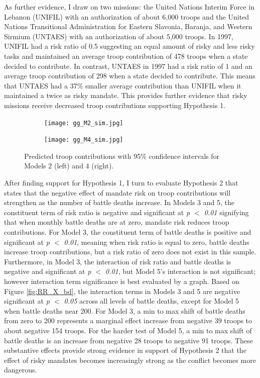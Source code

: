 \documentclass[12pt]{article}
\begin{document}
As further evidence, I draw on two missions: the United Nations Interim Force in Lebanon (UNIFIL) with an authorization of about 6,000 troops and the United Nations Transitional Administration for Eastern Slavonia, Baranja, and Western Sirmium (UNTAES) with an authorization of about 5,000 troops. In 1997, UNIFIL had a risk ratio of 0.5 suggesting an equal amount of risky and less risky tasks and maintained an average troop contribution of 478 troops when a state decided to contribute. In contrast, UNTAES in 1997 had a risk ratio of 1 and an average troop contribution of 298 when a state decided to contribute. This means that UNTAES had a 37\% smaller average contribution than UNIFIL when it maintained a twice as risky mandate. This provides further evidence that risky missions receive decreased troop contributions supporting Hypothesis 1.

\begin{figure}[t!]
\begin{subfigure}[h]{0.5\linewidth}
\texttt{[image: gg\_M2\_sim.jpg]}
\end{subfigure}
\hfill
\begin{subfigure}[h]{0.5\linewidth}
\texttt{[image: gg\_M4\_sim.jpg]}
\end{subfigure}
\vspace{-3mm}
\caption{\small Predicted troop contributions with 95\% confidence intervals for Models 2 (left) and 4 (right).}
\label{fig:RR}
\end{figure}

After finding support for Hypothesis 1, I turn to evaluate Hypothesis 2 that states that the negative effect of mandate risk on troop contributions will strengthen as the number of battle deaths increase. In Models 3 and 5, the constituent term of risk ratio is negative and significant at \textit{p $<$ 0.01} signifying that when monthly battle deaths are at zero, mandate risk reduces troop contributions. For Model 3, the constituent term of battle deaths is positive and significant at \textit{p $<$ 0.01}, meaning when risk ratio is equal to zero, battle deaths increase troop contributions, but a risk ratio of zero does not exist in this sample. Furthermore, in Model 3, the interaction of risk ratio and battle deaths is negative and significant at \textit{p $<$ 0.01}, but Model 5's interaction is not significant; however interaction term significance is best evaluated by a graph. Based on Figure \ref{fig:RR_X_bd}, the interaction terms in Models 3 and 5 are negative significant at \textit{p $<$ 0.05} across all levels of battle deaths, except for Model 5 when battle deaths near 200. For Model 3, a min to max shift of battle deaths from zero to 200 represents a marginal effect increase from negative 39 troops to about negative 154 troops. For the harder test of Model 5, a min to max shift of battle deaths is an increase from negative 28 troops to negative 91 troops. These substantive effects provide strong evidence in support of Hypothesis 2 that the effect of risky mandates becomes increasingly strong as the conflict becomes more dangerous. 
\end{document}
